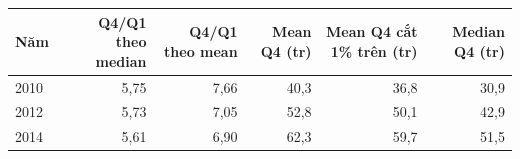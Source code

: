 \begin{tabular}{lrrrrr}
\toprule
Năm & Q4/Q1 theo median & Q4/Q1 theo mean & Mean Q4 (tr) & Mean Q4 cắt 1\% trên (tr) & Median Q4 (tr) \\
\midrule
2010 & 5,75 & 7,66 & 40,3 & 36,8 & 30,9 \\
2012 & 5,73 & 7,05 & 52,8 & 50,1 & 42,9 \\
2014 & 5,61 & 6,90 & 62,3 & 59,7 & 51,5 \\
\bottomrule
\end{tabular}
